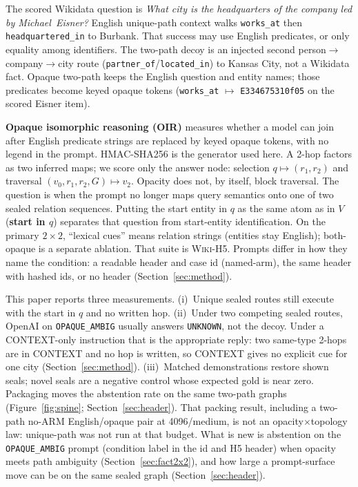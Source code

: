 \documentclass{article}
\begin{document}
The scored Wikidata question is \emph{What city is the headquarters of the
company led by \mbox{Michael Eisner}?}
English unique-path context walks \texttt{works\_at} then
\texttt{headquartered\_in} to Burbank. That success may use English
predicates, or only equality among identifiers.
The two-path decoy is an injected second person$\to$company$\to$city route
(\texttt{partner\_of}/\texttt{located\_in}) to Kansas City, not a Wikidata
fact.
Opaque two-path keeps the English question and entity names; those
predicates become keyed opaque tokens (\texttt{works\_at} $\mapsto$
\texttt{E334675310f05} on the scored Eisner item).

\textbf{Opaque isomorphic reasoning (OIR)} measures whether a model can
join after English predicate strings are replaced by keyed opaque tokens,
with no legend in the prompt.
HMAC-SHA256 is the generator used here.
A 2-hop factors as two inferred maps; we score only the answer node:
selection $q \mapsto (r_1,r_2)$ and traversal
$(v_0,r_1,r_2,G)\mapsto v_2$.
Opacity does not, by itself, block traversal.
The question is when the prompt no longer maps query semantics onto one of
two sealed relation sequences.
Putting the start entity in $q$ as the same atom as in $V$
(\textbf{start in $q$}) separates that question from start-entity
identification.
On the primary $2{\times}2$, ``lexical cues'' means relation strings
(entities stay English); both-opaque is a separate ablation.
That suite is \textsc{Wiki-H5}.
Prompts differ in how they name the condition: a readable header and case
id (named-arm), the same header with hashed ids, or no header
(Section~\ref{sec:method}).

This paper reports three measurements.
(i)~Unique sealed routes still execute with the start in $q$ and no written hop.
(ii)~Under two competing sealed routes, OpenAI on
\texttt{OPAQUE\_AMBIG} usually answers
\texttt{UNKNOWN}, not the decoy.
Under a CONTEXT-only instruction that is the appropriate reply: two
same-type 2-hops are in CONTEXT and no hop is written, so CONTEXT gives no
explicit cue for one city (Section~\ref{sec:method}).
(iii)~Matched demonstrations restore shown seals; novel seals are a
negative control whose expected gold is near zero.
Packaging moves the abstention rate on the same two-path graphs
(Figure~\ref{fig:spine}; Section~\ref{sec:header}).
That packing result, including a two-path no-ARM English/opaque pair at
4096/medium, is not an opacity$\times$topology law: unique-path was not
run at that budget.
What is new is abstention on the \texttt{OPAQUE\_AMBIG} prompt
(condition label in the id and H5 header) when opacity meets path ambiguity
(Section~\ref{sec:fact2x2}), and how large a prompt-surface move can be
on the same sealed graph (Section~\ref{sec:header}).
\end{document}
